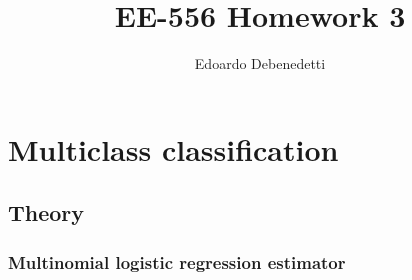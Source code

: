 \documentclass[12pt]{article}
\title{EE-556 Homework 3}
\author{Edoardo Debenedetti}
\begin{document}
\maketitle

\section{Multiclass classification}

\subsection{Theory}

\subsubsection{Multinomial logistic regression estimator}
\end{document}
